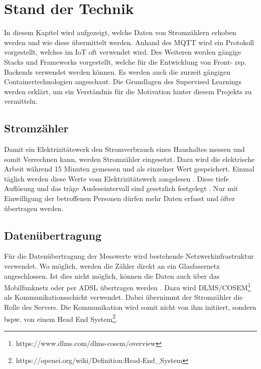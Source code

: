 \chapter{Stand der Technik}

In diesem Kapitel wird aufgezeigt,
welche Daten von Stromzählern erhoben werden und wie diese übermittelt werden.
Anhand des \ac{MQTT} wird ein Protokoll vorgestellt, welches im \ac{IoT} oft verwendet wird.
Des Weiteren werden gängige Stacks und Frameworks vorgestellt,
welche für die Entwicklung von Front- rsp. Backends verwendet werden können.
Es werden auch die zurzeit gängigen Containertechnologien angeschaut.
Die Grundlagen des Supervised Learnings werden erklärt,
um ein Verständnis für die Motivation hinter diesem Projekts zu vermitteln.


\section{Stromzähler}
Damit ein Elektrizitätswerk den Stromverbrauch eines Haushaltes messen und somit Verrechnen kann, werden Stromzähler eingesetzt.
Dazu wird die elektrische Arbeit während 15 Minuten gemessen und als einzelner Wert gespeichert.
Einmal täglich werden diese Werte vom Elektrizitätswerk ausgelesen \parencite{smart_meter_faq}.
Diese tiefe Auflösung und das träge Ausleseintervall sind gesetzlich festgelegt \parencite{admin_strom_VV_art8d}.
Nur mit Einwilligung der betroffenen Personen dürfen mehr Daten erfasst und öfter übertragen werden.

\section{Datenübertragung}
Für die Datenübertragung der Messwerte wird bestehende Netzwerkinfrastruktur verwendet.
Wo möglich, werden die Zähler direkt an ein Glasfasernetz angeschlossen.
Ist dies nicht möglich, können die Daten auch über das Mobilfunknetz oder per ADSL übertragen werden \parencite{smart_meter_faq}.  %
Dazu wird DLMS/COSEM\footnote{https://www.dlms.com/dlms-cosem/overview} als Kommunikationsschicht verwendet.
Dabei übernimmt der Stromzähler die Rolle des Servers.
Die Kommunikation wird somit nicht von ihm initiiert,
sondern bspw. von einem Head End System\footnote{https://openei.org/wiki/Definition:Head-End\_System}.

